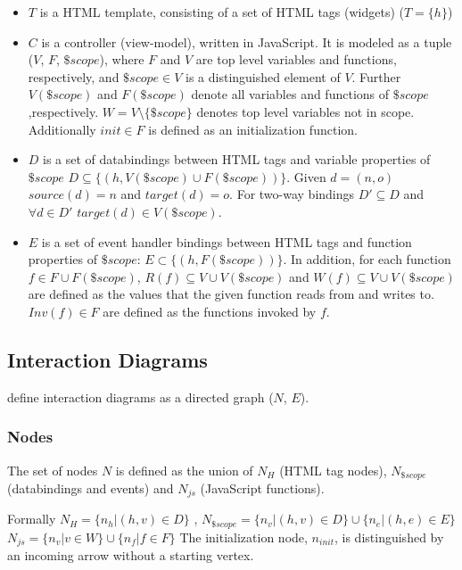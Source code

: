 \begin{itemize}
  \item $T$ is a HTML template, consisting of a set of HTML tags (widgets) ($T = \{h\}$)
  \item 
  $C$ is a controller (view-model), written in JavaScript. It is modeled as a tuple ($V$, $F$, $\$scope$), where $F$ and $V$ are top level variables and functions, respectively, and $\$scope \in V$ is a distinguished element of $V$. Further $V(\$scope)$ and $F(\$scope)$ denote all variables and functions of $\$scope$ ,respectively. $W = V \setminus \{\$scope\}$ denotes top level variables not in scope. Additionally $init \in F$ is defined as an initialization function.
  \item $D$ is a set of \glspl{databinding} between HTML tags and variable properties of $\$scope$ $ D \subseteq \{(h,V(\$scope) \cup F(\$scope))\}$. Given $d = (n,o)$ $source(d) = n$ and $target(d) = o$. For two-way bindings $D' \subseteq D$ and $\forall d \in D'$ $target(d) \in V(\$scope)$.
  \item $E$ is a set of event handler bindings between HTML tags and function properties of $\$scope$: $E \subset \{(h,F(\$scope))\}$. In addition, for each function $f \in F \cup F(\$scope)$, $R(f) \subseteq V \cup V(\$scope)$ and $W(f) \subseteq V \cup V(\$scope)$ are defined as the values that the given function reads from and writes to. $Inv(f) \in F $ are defined as the functions invoked by $f$. \parencite{zhang2019scenario}
\end{itemize}
\subsection{Interaction Diagrams}
\label{intro:zhang_interaction_diagrams}
\textcite{zhang2019scenario} define interaction diagrams as a directed graph ($N$, $E$). 

\subsubsection{Nodes}
The set of nodes $N$ is defined as the union of $N_H$ (HTML tag nodes), $N_{\$scope}$ (databindings and events) and  $N_{js}$ (JavaScript functions). 

Formally $N_H = \{n_h | (h,v) \in D\}$ , $N_{\$scope} = \{n_v | (h,v) \in D\} \cup \{n_e | (h,e) \in E\}$ 
$N_{js} = \{n_v | v \in W\} \cup \{n_f | f \in F\} $ The initialization node, $n_{init}$, is distinguished by an incoming arrow without a starting vertex.

